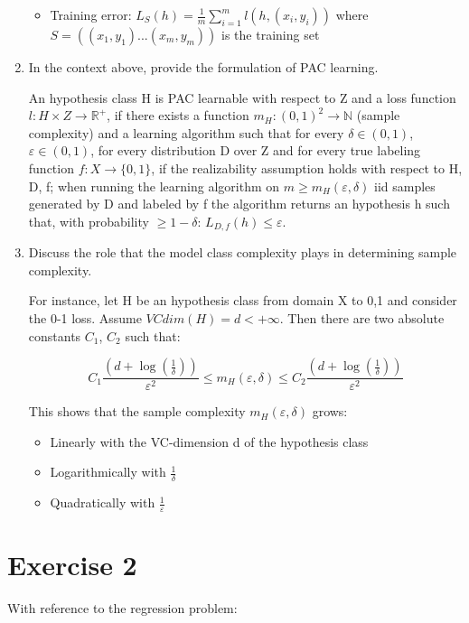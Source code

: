 \documentclass[a4paper,11pt,oneside]{book}
\begin{document}
\begin{enumerate}
\begin{solution}
\begin{itemize}
        \item Training error: $L_S(h) = \frac{1}{m}\sum_{i=1}^m l(h,(x_i,y_i))$ where $S = ((x_1,y_1)...(x_m,y_m))$ is the training set
        \end{itemize}
    \end{solution}
\clearpage
\item In the context above, provide the formulation of PAC learning.
    \begin{solution}    
        An hypothesis class H is PAC learnable with respect to Z and a loss function $l: H\times Z \to \mathbb{R}^+$, if there exists a function $m_H: (0,1)^2 \to \mathbb{N}$ (sample complexity) and a learning algorithm such that for every $\delta \in (0,1)$, $\varepsilon \in (0,1)$, for every distribution D over Z and for every true labeling function $f: X \to \{0,1\}$, if the realizability assumption holds with respect to H, D, f; when running the learning algorithm on $m \geq m_H(\varepsilon,\delta)$ iid samples generated by D and labeled by f the algorithm returns an hypothesis h such that, with probability $\geq 1-\delta$: $L_{D,f}(h) \leq \varepsilon$.
    \end{solution}
\item Discuss the role that the model class complexity plays in determining sample complexity.
    \begin{solution}
        For instance, let H be an hypothesis class from domain X to {0,1} and consider the 0-1 loss. Assume $VCdim(H) = d < +\infty$. Then there are two absolute constants $C_1$, $C_2$ such that:
        
        $$C_1\frac{(d + \log(\frac{1}{\delta}))}{\varepsilon^2} \leq m_H(\varepsilon,\delta) \leq C_2\frac{(d + \log(\frac{1}{\delta}))}{\varepsilon^2}$$
        
        This shows that the sample complexity $m_H(\varepsilon,\delta)$ grows:
        \begin{itemize}
        \item Linearly with the VC-dimension d of the hypothesis class
        \item Logarithmically with $\frac{1}{\delta}$
        \item Quadratically with $\frac{1}{\varepsilon}$
        \end{itemize}
    \end{solution}
\end{enumerate}

\clearpage
\section{Exercise 2}
With reference to the regression problem:
\end{document}
